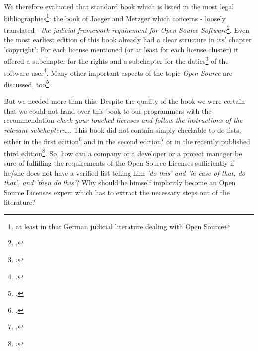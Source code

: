 We therefore evaluated that standard book which is listed in the most legal
bibliographies\footnote{at least in that German judicial literature dealing with
Open Source}: the book of Jaeger and Metzger which concerns - loosely translated
- \textit{the judicial framework requirement for Open Source
Software}\footcite[cf.][V - It can not be any surprise that both authors,
Mr. Jaeger and Mr. Metzger are members of ifross (cf.
\texttt{http://www.ifross.org/personen/}, wp.)]{JaeMet2002a}. Even the most
earliest edition of this book already had a clear structure in its' chapter
'copyright': For each license mentioned (or at least for each license cluster)
it offered a subchapter for the rights and a subchapter for the
duties\footcite[cf.][30ff]{JaeMet2002a} of the software user\footcite[For
getting a good survey of the structure and the line of thought see the contents
cf.][VIIIf]{JaeMet2002a}. Many other important aspects of the topic
\textit{Open Source} are discussed, too\footcite[pars pro toto: have a
look at the chapter concerning the liability: cf.][137ff]{JaeMet2002a}.

But we needed more than this. Despite the quality of the book we were certain
that we could not hand over this book to our programmers with the recommendation
\textit{check your touched licenses and follow the instructions of the relevant
subchapters\ldots}. This book did not contain simply checkable to-do lists,
either in the first edition\footcite[cf.][VIff]{JaeMet2002a} and in the
second edition\footcite[cf.][VIIff]{JaeMet2006a} or in the recently
published third edition\footcite[cf.][VIIIff. Naturally we use this latest
edition for adopting or discussing systematical aspects]{JaeMet2011a}. So, how
can a company or a developer or a project manager be sure of fulfilling the
requirements of the Open Source Licenses sufficiently if he/she does not have a
verified list telling him \textit{'do this' and 'in case of that, do that', and
'then do this'}? Why should he himself implicitly become an Open Source Licenses
expert which has to extract the necessary steps out of the literature?

%
